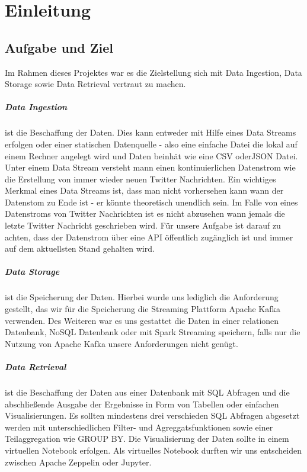 \chapter{Einleitung}
\label{chap:einleitung}

\section{Aufgabe und Ziel}
Im Rahmen dieses Projektes war es die Zielstellung sich mit Data Ingestion, Data Storage sowie Data Retrieval vertraut zu machen.
\paragraph{Data Ingestion} ist die Beschaffung der Daten.
Dies kann entweder mit Hilfe eines Data Streams erfolgen oder einer statischen Datenquelle - also eine einfache Datei die lokal
auf einem Rechner angelegt wird und Daten beinhät wie \zb{} eine \ac{CSV} oder\ac{JSON} Datei.
Unter einem Data Stream versteht mann einen kontinuierlichen Datenstrom wie \zb{}
die Erstellung von immer wieder neuen Twitter Nachrichten.
Ein wichtiges Merkmal eines Data Streams ist, dass man nicht vorhersehen kann wann der Datenstom zu Ende ist - er könnte theoretisch unendlich sein.
Im Falle von eines Datenstroms von Twitter Nachrichten ist es nicht abzusehen wann jemals die letzte Twitter Nachricht geschrieben wird.
Für unsere Aufgabe ist darauf zu achten, dass der Datenstrom über eine API öffentlich zugänglich ist und immer auf dem aktuellsten Stand gehalten wird.
\paragraph{Data Storage} ist die Speicherung der Daten.
Hierbei wurde uns lediglich die Anforderung gestellt, das wir für die Speicherung die Streaming Plattform Apache Kafka verwenden.
Des Weiteren war es uns gestattet die Daten in einer relationen Datenbank, NoSQL Datenbank oder mit Spark Streaming speichern,
falls nur die Nutzung von Apache Kafka unsere Anforderungen nicht genügt.
\paragraph{Data Retrieval} ist die Beschaffung der Daten aus einer Datenbank mit SQL Abfragen und die abschließende Ausgabe
der Ergebnisse in Form von Tabellen oder einfachen Visualisierungen.
Es sollten mindestens drei verschieden SQL Abfragen abgesetzt werden mit unterschiedlichen Filter- und Agreggatsfunktionen sowie einer Teilaggregation wie \zb{} GROUP BY.
Die Visualisierung der Daten sollte in einem virtuellen Notebook erfolgen.
Als virtuelles Notebook durften wir uns entscheiden zwischen Apache Zeppelin oder Jupyter.

